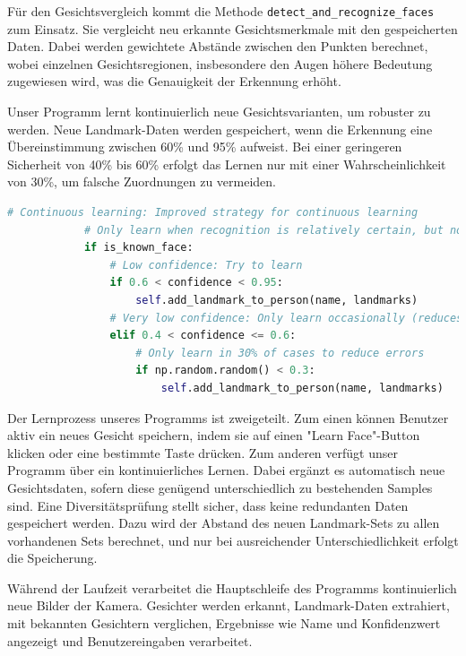 Für den Gesichtsvergleich kommt die Methode \texttt{detect\_and\_recognize\_faces} zum Einsatz. Sie vergleicht neu erkannte Gesichtsmerkmale mit den gespeicherten Daten.
Dabei werden gewichtete Abstände zwischen den Punkten berechnet, wobei einzelnen Gesichtsregionen, insbesondere den Augen höhere Bedeutung zugewiesen wird, was die Genauigkeit der Erkennung erhöht.

Unser Programm lernt kontinuierlich neue Gesichtsvarianten, um robuster zu werden. Neue Landmark-Daten werden gespeichert, wenn die Erkennung eine Übereinstimmung zwischen 60\% und 95\% aufweist. 
Bei einer geringeren Sicherheit von 40\% bis 60\% erfolgt das Lernen nur mit einer Wahrscheinlichkeit von 30\%, um falsche Zuordnungen zu vermeiden.
\begin{lstlisting}[language=Python, caption={Vergleich für Kontinuierliches Lernen}, label={lst:mediapipe_learning}, inputencoding=utf8]
    # Continuous learning: Improved strategy for continuous learning
            # Only learn when recognition is relatively certain, but not perfect
            if is_known_face:
                # Low confidence: Try to learn
                if 0.6 < confidence < 0.95:
                    self.add_landmark_to_person(name, landmarks)
                # Very low confidence: Only learn occasionally (reduces false associations)
                elif 0.4 < confidence <= 0.6:
                    # Only learn in 30% of cases to reduce errors
                    if np.random.random() < 0.3:
                        self.add_landmark_to_person(name, landmarks)
\end{lstlisting}

Der Lernprozess unseres Programms ist zweigeteilt. Zum einen können Benutzer aktiv ein neues Gesicht speichern, indem sie auf einen "Learn Face"-Button klicken oder eine bestimmte Taste drücken.
Zum anderen verfügt unser Programm über ein kontinuierliches Lernen. Dabei ergänzt es automatisch neue Gesichtsdaten, sofern diese genügend unterschiedlich zu bestehenden Samples sind.
Eine Diversitätsprüfung stellt sicher, dass keine redundanten Daten gespeichert werden. Dazu wird der Abstand des neuen Landmark-Sets zu allen vorhandenen Sets berechnet, und nur bei ausreichender Unterschiedlichkeit erfolgt die Speicherung.

Während der Laufzeit verarbeitet die Hauptschleife des Programms kontinuierlich neue Bilder der Kamera. Gesichter werden erkannt, Landmark-Daten extrahiert, mit bekannten Gesichtern verglichen, Ergebnisse wie Name und Konfidenzwert angezeigt und Benutzereingaben verarbeitet.

